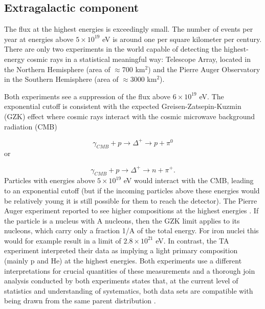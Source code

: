 \subsection{Extragalactic component}
The flux at the highest energies is exceedingly small. The number of events per year at energies above $5 \times 10^{19}$ eV is around one per square kilometer per century. There are only two experiments in the world capable of detecting the highest-energy cosmic rays in a statistical meaningful way: Telescope Array, located in the Northern Hemisphere (area of $\approx$700 km$^2$) and the Pierre Auger Observatory in the Southern Hemisphere (area of $\approx$3000 km$^2$).

Both experiments see a suppression of the flux above $6 \times 10^{19}$ eV. The exponential cutoff is consistent with the expected Greisen-Zatsepin-Kuzmin (GZK) effect \cite{Greisen:1966jv,Zatsepin:1966jv} where cosmic rays interact with the cosmic microwave background radiation (CMB)

\begin{equation}
\gamma_{CMB} + p \rightarrow \Delta^+ \rightarrow p + \pi^0
\end{equation} 
or

\begin{equation}
\gamma_{CMB} + p \rightarrow \Delta^+ \rightarrow n + \pi^+.
\end{equation}
Particles with energies above $5 \times 10^{19}$ eV would interact with the CMB, leading to an exponential cutoff (but if the incoming particles above these energies would be relatively young it is still possible for them to reach the detector). The Pierre Auger experiment reported to see higher compositions at the highest energies \cite{icrc2017:pa}. If the particle is a nucleus with A nucleons, then the GZK limit applies to its nucleons, which carry only a fraction 1/A of the total energy. For iron nuclei this would for example result in a limit of $2.8 \times 10^{21}$ eV. In contrast, the TA experiment interpreted their data as implying a light primary composition (mainly p and He) at the highest energies. Both experiments use a different interpretations for crucial quantities of these measurements and a thorough join analysis conducted by both experiments states that, at the current level of statistics and understanding of systematics, both data sets are compatible with being drawn from the same parent distribution \cite{PDG2018url}.

